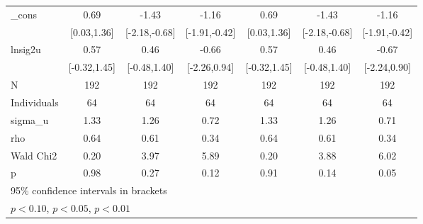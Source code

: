 {\begin{tabular}{l*{6}{c}}
\addlinespace
\_cons      &                  0.69\sym{**} &                 -1.43\sym{***}&                 -1.16\sym{***}&                  0.69\sym{**} &                 -1.43\sym{***}&                 -1.16\sym{***}\\
            &           [0.03,1.36]         &         [-2.18,-0.68]         &         [-1.91,-0.42]         &           [0.03,1.36]         &         [-2.18,-0.68]         &         [-1.91,-0.42]         \\
\addlinespace
lnsig2u     &                  0.57         &                  0.46         &                 -0.66         &                  0.57         &                  0.46         &                 -0.67         \\
            &          [-0.32,1.45]         &          [-0.48,1.40]         &          [-2.26,0.94]         &          [-0.32,1.45]         &          [-0.48,1.40]         &          [-2.24,0.90]         \\
\midrule
N           &                   192         &                   192         &                   192         &                   192         &                   192         &                   192         \\
Individuals &                    64         &                    64         &                    64         &                    64         &                    64         &                    64         \\
sigma\_u     &                  1.33         &                  1.26         &                  0.72         &                  1.33         &                  1.26         &                  0.71         \\
rho         &                  0.64         &                  0.61         &                  0.34         &                  0.64         &                  0.61         &                  0.34         \\
Wald Chi2   &                  0.20         &                  3.97         &                  5.89         &                  0.20         &                  3.88         &                  6.02         \\
p           &                  0.98         &                  0.27         &                  0.12         &                  0.91         &                  0.14         &                  0.05         \\
\bottomrule
\multicolumn{7}{l}{\footnotesize 95\% confidence intervals in brackets}\\
\multicolumn{7}{l}{\footnotesize \sym{*} \(p<0.10\), \sym{**} \(p<0.05\), \sym{***} \(p<0.01\)}\\
\end{tabular}
}
